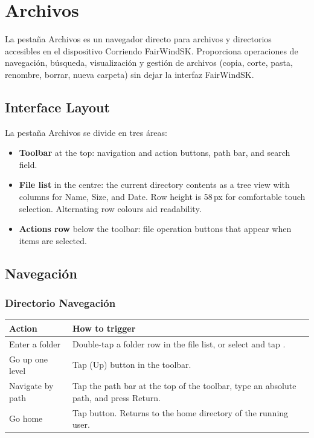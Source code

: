 \chapter{Archivos}
\label{ch:files}

La pestaña Archivos es un navegador directo para archivos y directorios accesibles en el dispositivo
Corriendo FairWindSK.
Proporciona operaciones de navegación, búsqueda, visualización y gestión de archivos (copia, corte, pasta, renombre,
borrar, nueva carpeta) sin dejar la interfaz FairWindSK.


\section{Interface Layout}

La pestaña Archivos se divide en tres áreas:

\begin{itemize}
  \item \textbf{Toolbar} at the top: navigation and action buttons, path bar, and search field.
  \item \textbf{File list} in the centre: the current directory contents as a tree view with columns for Name, Size, and Date. Row height is 58\,px for comfortable touch selection. Alternating row colours aid readability.
  \item \textbf{Actions row} below the toolbar: file operation buttons that appear when items are selected.
\end{itemize}

\section{Navegación}

\subsection{Directorio Navegación}

\begin{longtable}{L{3cm} L{10.7cm}}
\toprule
{}
{\sffamily\bfseries\color{white} Action} &
{\sffamily\bfseries\color{white} How to trigger} \\
\midrule
Enter a folder & Double-tap a folder row in the file list, or select and tap . \\
Go up one level & Tap  (Up) button in the toolbar. \\
Navigate by path & Tap the path bar at the top of the toolbar, type an absolute path, and press Return. \\
Go home & Tap  button. Returns to the home directory of the running user. \\
\bottomrule
\end{longtable}

